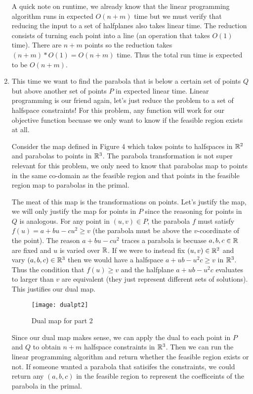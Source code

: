 \documentclass[11pt]{article}
\begin{document}
\begin{enumerate}
    A quick note on runtime, we already know that the linear programming algorithm runs in expected $O(n+m)$ time but we must verify that reducing the input to a set of halfplanes also takes linear time.
    The reduction consists of turning each point into a line (an operation that takes $O(1)$ time).
    There are $n+m$ points so the reduction takes $(n+m) * O(1) = O(n+m)$ time.
    Thus the total run time is expected to be $O(n+m)$.

    \item This time we want to find the parabola that is below a certain set of points $Q$ but above another set of points $P$ in expected linear time.
    Linear programming is our friend again, let's just reduce the problem to a set of halfspace constraints!
    For this problem, any function will work for our objective function becuase we only want to know if the feasible region exists at all.

    Consider the map defined in Figure 4 which takes points to halfspaces in $\mathbb{R} ^2$ and parabolas to points in $\mathbb{R} ^3$.
    The parabola transformation is not super relevant for this problem, we only need to know that parabolas map to points in the same co-domain as the feasible region and that points in the feasible region map to parabolas in the primal.

    The meat of this map is the transformations on points.
    Let's justify the map, we will only justify the map for points in $P$ since the reasoning for points in $Q$ is analogous.
    For any point in $(u,v) \in P$, the parabola $f$ must satisfy $f(u) = a + bu - cu^2 \geq v$ (the parabola must be above the $v$-coordinate of the point).
    The reason $a + bu - cu^2$ traces a parabola is becuase $a,b,c \in \mathbb{R}$ are fixed and $u$ is varied over $\mathbb{R}$.
    If we were to instead fix $(u,v) \in \mathbb{R}^2$ and vary $(a,b,c) \in \mathbb{R}^3$ then we would have a halfspace $a + ub - u^2c \geq v$ in $\mathbb{R}^3$.
    Thus the condition that $f(u) \geq v$ and the halfplane $a + ub - u^2c$ evaluates to larger than $v$ are equivalent (they just represent different sets of solutions).
    This justifies our dual map.

    \begin{figure}[h]
        \centering
        \texttt{[image: dualpt2]}
        \label{fig:dualpt2}
        \caption{Dual map for part 2}
    \end{figure}

    Since our dual map makes sense, we can apply the dual to each point in $P$ and $Q$ to obtain $n+m$ halfspace constraints in $\mathbb{R} ^3$.
    Then we can run the linear programming algorithm and return whether the feasible region exists or not.
    If someone wanted a parabola that satisifes the constraints, we could return any $(a,b,c)$ in the feasible region to represent the coefficeints of the parabola in the primal.


\end{enumerate}
\end{document}
